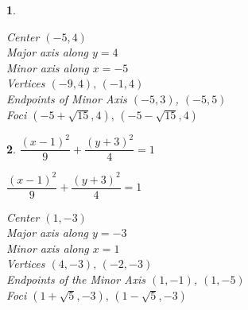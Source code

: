 \documentclass{amsbook}
\newtheorem{exc}{}
\newenvironment{ex}{\begin{exc}\normalfont}{\end{exc}}
\numberwithin{section}{chapter}
\numberwithin{equation}{chapter}
\begin{document}
\begin{multicols}{2}
\begin{ex}
\begin{sol}
		Center $(-5, 4)$\\
		Major axis along $y = 4$\\
		Minor axis along $x = -5$\\
		Vertices $(-9, 4), \, (-1, 4)$\\
		Endpoints of Minor Axis $(-5,3)$, $(-5,5)$\\
		Foci $(-5 + \sqrt{15}, 4), \, (-5 - \sqrt{15}, 4)$\\
	\end{sol}
\end{ex}

\begin{ex}
	$\dfrac{(x-1)^2}{9}+\dfrac{(y+3)^2}{4} = 1$
	\begin{sol}
	$\dfrac{(x-1)^2}{9}+\dfrac{(y+3)^2}{4} = 1$
	
	Center $(1, -3)$\\
	Major axis along $y = -3$\\
	Minor axis along $x = 1$\\
	Vertices $(4, -3), \, (-2, -3)$\\
	Endpoints of the Minor Axis $(1,-1)$, $(1,-5)$\\
	Foci $(1+\sqrt{5}, -3), \, (1-\sqrt{5}, -3)$\\	
	\end{sol}
\end{ex}
\end{multicols}
\end{document}
